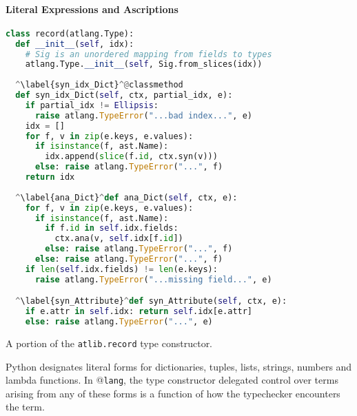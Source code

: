 \paragraph{Literal Expressions and Ascriptions}
\begin{codelisting}[t]
\begin{lstlisting}[language=Python]
class record(atlang.Type):
  def __init__(self, idx): 
    # Sig is an unordered mapping from fields to types
    atlang.Type.__init__(self, Sig.from_slices(idx))
    
  ^\label{syn_idx_Dict}^@classmethod
  def syn_idx_Dict(self, ctx, partial_idx, e):
    if partial_idx != Ellipsis: 
      raise atlang.TypeError("...bad index...", e)
    idx = []
    for f, v in zip(e.keys, e.values):
      if isinstance(f, ast.Name): 
        idx.append(slice(f.id, ctx.syn(v)))
      else: raise atlang.TypeError("...", f)
    return idx
    
  ^\label{ana_Dict}^def ana_Dict(self, ctx, e):
    for f, v in zip(e.keys, e.values):
      if isinstance(f, ast.Name):
        if f.id in self.idx.fields: 
          ctx.ana(v, self.idx[f.id])
        else: raise atlang.TypeError("...", f)
      else: raise atlang.TypeError("...", f)
    if len(self.idx.fields) != len(e.keys): 
      raise atlang.TypeError("...missing field...", e)

  ^\label{syn_Attribute}^def syn_Attribute(self, ctx, e):
    if e.attr in self.idx: return self.idx[e.attr]
    else: raise atlang.TypeError("...", e)
\end{lstlisting}
%
\caption{A portion of the \texttt{atlib.record} type constructor.}
\label{record}
\end{codelisting}
Python designates literal forms for dictionaries, tuples, lists, strings, numbers and lambda functions. In @\texttt{lang}, the type constructor delegated control over terms arising from any of these forms is a function of how the typechecker encounters the term.

